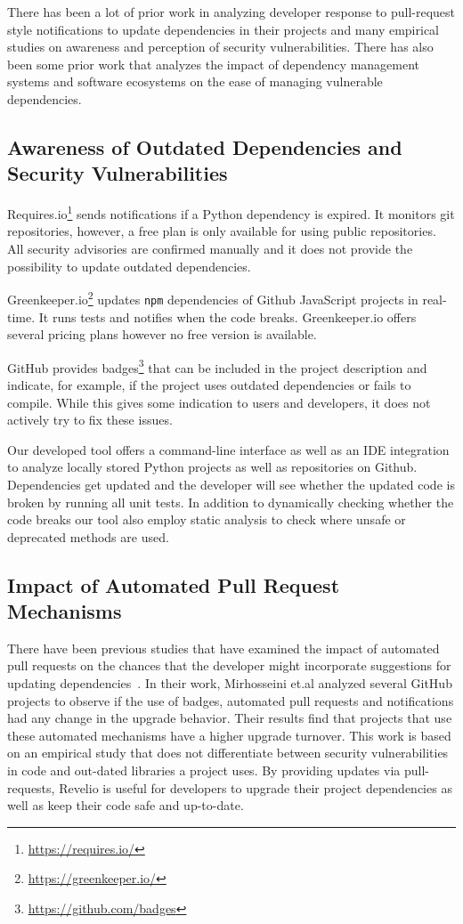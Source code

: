There has been a lot of prior work in analyzing developer response to pull-request style notifications to update dependencies in their projects and many empirical studies on awareness and perception of security vulnerabilities. There has also been some prior work that analyzes the impact of dependency management systems and software ecosystems on the ease of managing vulnerable dependencies. 

\subsection{Awareness of Outdated Dependencies and Security Vulnerabilities}

Requires.io\footnote{\url{https://requires.io/}} sends notifications if a Python dependency is expired. It monitors git repositories, however, a free plan is only available for using public repositories. All security advisories are confirmed manually and it does not provide the possibility to update outdated dependencies.

Greenkeeper.io\footnote{\url{https://greenkeeper.io/}} updates \texttt{npm} dependencies of Github JavaScript projects in real-time. It runs tests and notifies when the code breaks. Greenkeeper.io offers several pricing plans however no free version is available.

GitHub provides badges\footnote{\url{https://github.com/badges}} that can be included in the project description and indicate, for example, if the project uses outdated dependencies or fails to compile. While this gives some indication to users and developers, it does not actively try to fix these issues.

Our developed tool offers a command-line interface as well as an IDE integration to analyze locally stored Python projects as well as repositories on Github. Dependencies get updated and the developer will see whether the updated code is broken by running all unit tests. In addition to dynamically checking whether the code breaks our tool also employ static analysis to check where unsafe or deprecated methods are used.

\subsection{Impact of Automated Pull Request Mechanisms}

There have been previous studies that have examined the impact of automated pull requests on the chances that the developer might incorporate suggestions for updating dependencies~\cite{Mirhosseini:2017}. In their work, Mirhosseini et.al analyzed several GitHub projects to observe if the use of badges, automated pull requests and notifications had any change in the upgrade behavior. Their results find that projects that use these automated mechanisms have a higher upgrade turnover. This work is based on an empirical study that does not differentiate between security vulnerabilities in code and out-dated libraries a project uses. 
By providing updates via pull-requests, Revelio is useful for developers to upgrade their project dependencies as well as keep their code safe and up-to-date.
